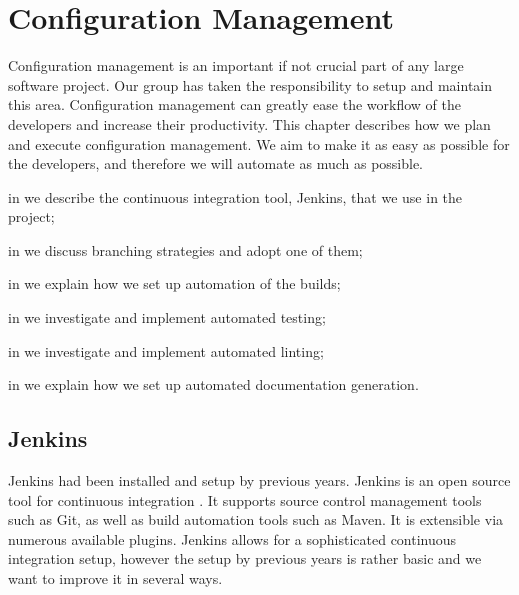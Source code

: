 \chapter{Configuration Management}\label{chap:config_management}
Configuration management is an important if not crucial part of any large software project. Our group has taken the responsibility to setup and maintain this area. Configuration management can greatly ease the workflow of the developers and increase their productivity. This chapter describes how we plan and execute configuration management. We aim to make it as easy as possible for the developers, and therefore we will automate as much as possible.

\begin{chapterorganization}
  \item in  we describe the continuous integration tool, Jenkins, that we use in the project;
  \item in  we discuss branching strategies and adopt one of them;
  \item in  we explain how we set up automation of the builds;
  \item in  we investigate and implement automated testing;
  \item in  we investigate and implement automated linting;
  \item in  we explain how we set up automated documentation generation.
\end{chapterorganization}

\section{Jenkins}\label{sec:jenkins}
Jenkins had been installed and setup by previous years. Jenkins is an open source tool for continuous integration \parencite{JenkinsWebsite}. It supports source control management tools such as Git, as well as build automation tools such as Maven. It is extensible via numerous available plugins. Jenkins allows for a sophisticated continuous integration setup, however the setup by previous years is rather basic and we want to improve it in several ways.

